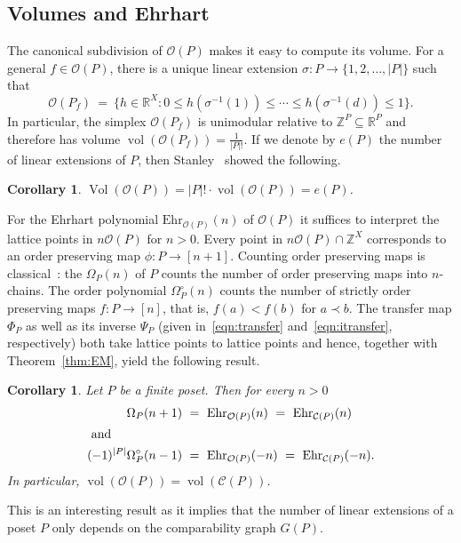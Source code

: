 \documentclass[11pt]{amsart}
\newtheorem{cor}[thm]{Corollary}
\theoremstyle{definition}
\begin{document}
\subsection{Volumes and Ehrhart}\label{ssec:TO_ehrhart}
The canonical subdivision of ${\mathcal{O}({P})}$ makes it easy to compute its volume.
For a general $f \in {\mathcal{O}({P})}$, there is a unique linear extension $\sigma : {P}
\rightarrow \{1,2,\dots,|{P}|\}$ such that 
\[
    {\mathcal{O}({{P}_f})} \ = \ \{ h \in {\mathbb{R}}^X : 0 \le h(\sigma^{-1}(1)) \le \cdots \le
    h(\sigma^{-1}(d)) \le 1 \}.
\]
In particular, the simplex ${\mathcal{O}({{P}_f})}$ is unimodular relative to ${\mathbb{Z}}^{P}
\subseteq {\mathbb{R}}^{P}$ and therefore has volume $\operatorname{vol}({\mathcal{O}({{P}_f})}) =
\frac{1}{|{P}|!}$. If we denote by $e({P})$ the number of linear extensions of
${P}$, then Stanley~\cite{TwoPoset} showed the following.
\begin{cor}\label{cor:O_vol}
    $\operatorname{Vol}({\mathcal{O}({P})}) = |{P}|! \cdot \operatorname{vol}({\mathcal{O}({P})}) = e({P})$.
\end{cor}

For the Ehrhart polynomial ${\mathrm{Ehr}}_{{\mathcal{O}({P})}}(n)$ of ${\mathcal{O}({P})}$ it suffices to
interpret the lattice points in $n {\mathcal{O}({P})}$ for $n > 0$. Every point in
$n{\mathcal{O}({P})} \cap {\mathbb{Z}}^X$ corresponds to an order preserving map $\phi : {P}
\rightarrow [n+1]$. Counting order preserving maps is
classical~\cite[Sect.~3.15]{EC1new}: the {\textbf{\color{black}{order polynomial}}}
$\Omega_{P}(n)$ of ${P}$ counts the number of order preserving maps into
$n$-chains. The {\textbf{\color{black}{strict}}} order polynomial $\Omega^\circ_{P}(n)$ counts the
number of strictly order preserving maps $f : {P} \rightarrow [n]$, that is,
$f(a) < f(b)$ for $a \prec b$.  The transfer map ${\Phi}_{P}$ as well as its
inverse ${\Psi}_{P}$ (given in~\eqref{eqn:transfer}
and~\eqref{eqn:itransfer}, respectively) both take lattice points to lattice
points and hence, together with Theorem~\ref{thm:EM}, yield the following
result.

\begin{cor}\label{cor:O_C_iso}
    Let ${P}$ be a finite poset. Then for every $n > 0$
    \begin{align*}
        \Omega_{P}(n+1)
        & \ = \ 
        {\mathrm{Ehr}}_{{\mathcal{O}({P})}}(n) \ = \ {\mathrm{Ehr}}_{{\mathcal{C}({P})}}(n)\\
    \intertext{ and }
        (-1)^{|{P}|}\Omega^\circ_{P}(n-1) &\ = \ 
        {\mathrm{Ehr}}_{{\mathcal{O}({P})}}(-n) \ = \ {\mathrm{Ehr}}_{{\mathcal{C}({P})}}(-n).
    \end{align*}
    In particular, $\operatorname{vol}({\mathcal{O}({P})}) = \operatorname{vol}({\mathcal{C}({P})})$.
\end{cor}
This is an interesting result as it implies that the number of linear
extensions of a poset ${P}$ only depends on the comparability graph $G({P})$.
\end{document}
